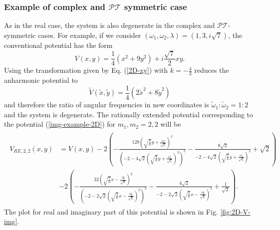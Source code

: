 \documentclass[a4paper, 12pt]{article}
\newcommand{\td}[1]{\tilde{#1}}
\begin{document}
\subsubsection{Example of complex and $\mathcal{PT}$ symmetric case}

 As in the real case, the system is also degenerate in the complex and $\mathcal{PT}$-symmetric cases.  For example, if we consider \((\omega_1, \omega_2, \lambda) = \left(1, 3, i\sqrt7\right)\), the conventional potential has the form
\begin{equation}\label{img-example-2D}
  V(x,y)= \frac{1}{4}\left(x^2+9y^2\right)+ i\frac{\sqrt{7}}{2} xy.
\end{equation}
Using the transformation given by Eq. (\ref{2D-xy}) with $k=-\frac{4}{3}$ reduces the anharmonic potential to
\[\tilde{V}(\td{x},\td{y})=\frac{1}{4} \left(2 \td{x}^2+8\td{y}^2\right)\]
and therefore the ratio of angular frequencies in new coordinates is $\td{\omega}_1:\td{\omega}_2=1:2$ and the system is degenerate. The rationally extended potential corresponding to the potential (\ref{img-example-2D}) for $m_1,m_2=2,2$ will be 
\begin{align*}
  \begin{split}
  V_{RE,2,2}(x,y) &= V(x,y)-2 \left(-\frac{128 \left(\sqrt{\frac{7}{6}} y+\frac{i x}{\sqrt{6}}\right)^2}{\left(-2-4 \sqrt{2} \left(\sqrt{\frac{7}{6}} y+\frac{i x}{\sqrt{6}}\right)^2\right)^2}-\frac{8 \sqrt{2}}{-2-4 \sqrt{2} \left(\sqrt{\frac{7}{6}} y+\frac{i x}{\sqrt{6}}\right)^2}+\sqrt{2}\right)\\&-2 \left(-\frac{32 \left(\sqrt{\frac{7}{6}} x-\frac{i y}{\sqrt{6}}\right)^2}{\left(-2-2 \sqrt{2} \left(\sqrt{\frac{7}{6}} x-\frac{i y}{\sqrt{6}}\right)^2\right)^2}-\frac{4 \sqrt{2}}{-2-2 \sqrt{2} \left(\sqrt{\frac{7}{6}} x-\frac{i y}{\sqrt{6}}\right)^2}+\frac{1}{\sqrt{2}}\right).
\end{split}
\end{align*}
The plot for real and imaginary part of this potential is shown in Fig. \ref{fig:2D-V-img}.

 
\end{document}
